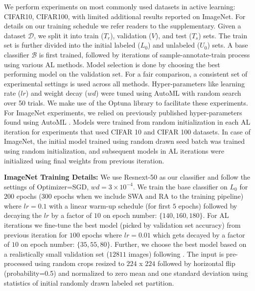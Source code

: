 \documentclass[10pt,twocolumn,letterpaper]{article}
\begin{document}
We perform experiments on most commonly used datasets in active learning: CIFAR10, CIFAR100, with limited additional results reported on ImageNet. 
For details on our training schedule we refer readers to the supplementary.
Given a dataset $\mathcal{D}$, we split it into train ($T_r$), validation ($V$), and test ($T_s$) sets. The train set is further divided into the initial labeled ($L_0$) and unlabeled ($U_0$) sets. A base classifier $\mathcal{B}$ is first trained, followed by iterations of sample-annotate-train process using various AL methods. Model selection is done by choosing the best performing model on the validation set. For a fair comparison, a consistent set of experimental settings is used across all methods. 
Hyper-parameters like learning rate ($lr$) and weight decay ($wd$) were tuned using AutoML with random search over 50 trials. We make use of the Optuna library \cite{optuna_akiba2019optuna} to facilitate these experiments. For ImageNet experiments, we relied on previously published hyper-parameters found using AutoML \cite{S4L_DBLP:journals/corr/abs-1905-03670}.
Models were trained from random initialization in each AL iteration for experiments that used CIFAR 10 and CIFAR 100 datasets. In case of ImageNet, the initial model trained using random drawn seed batch was trained using random initialization, and subsequent models in AL iterations were initialized using final weights from previous iteration.

\noindent \textbf{ImageNet Training Details: }We use Resnext-50 \cite{resnext_50_xie2017aggregated} as our classifier and follow the settings of \cite{S4L_DBLP:journals/corr/abs-1905-03670} \ie
Optimizer=SGD,  
$wd=3\times10^{-4}$. We train the base classifier on $L_{0}$ for $200$ epochs (300 epochs when we include SWA and RA to the training pipeline) where $lr=0.1$ with a linear warm-up schedule (for first $5$ epochs) followed by decaying the $lr$ by a factor of $10$ on epoch number: $\{140, 160, 180\}$. For AL iterations we fine-tune the best model (picked by validation set accuracy) from previous iteration for $100$ epochs where $lr=0.01$ which gets decayed by a factor of $10$ on epoch number: $\{35, 55, 80\}$. Further, we choose the best model based on a realistically small validation set (\ie $12811$ images) following \cite{S4L_DBLP:journals/corr/abs-1905-03670}. The input is pre-processed using random crops resized to $224$ x $224$ followed by horizontal flip (probability=0.5) and normalized to zero mean and one standard deviation using statistics of initial randomly drawn labeled set partition.
\end{document}
